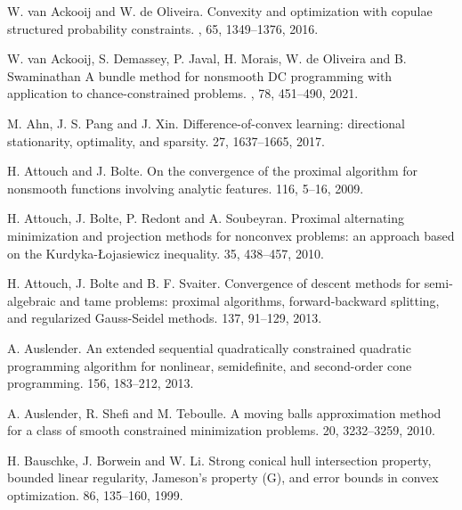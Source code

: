 \documentclass[10pt]{article}
\numberwithin{equation}{section}
\begin{document}
\begin{thebibliography}{99}

{\color{black} W. van Ackooij and W. de Oliveira.
\newblock Convexity and optimization with copulae
structured probability constraints.
, 65, 1349--1376, 2016.}

{\color{black} W. van Ackooij, S. Demassey, P. Javal, H. Morais, W. de Oliveira and B. Swaminathan
\newblock A bundle method for nonsmooth DC programming with application to chance-constrained problems.
, 78, 451--490, 2021.}


M. Ahn, J. S. Pang and J. Xin.
\newblock Difference-of-convex learning: directional stationarity, optimality, and sparsity.
 27, 1637--1665, 2017.


H. Attouch and J. Bolte.
\newblock On the convergence of the proximal algorithm for nonsmooth functions involving analytic features.
 116, 5--16, 2009.

H. Attouch, J. Bolte, P. Redont and A. Soubeyran.
\newblock Proximal alternating minimization and projection methods for nonconvex problems: an approach based on the Kurdyka-{\L}ojasiewicz inequality.
 35, 438--457, 2010.

H. Attouch, J. Bolte and B. F. Svaiter.
\newblock Convergence of descent methods for semi-algebraic and tame problems: proximal algorithms, forward-backward splitting, and regularized Gauss-Seidel methods.
 137, 91--129, 2013.

A. Auslender.
\newblock An extended sequential quadratically constrained quadratic programming algorithm for nonlinear, semidefinite, and second-order cone programming.
 156, 183--212, 2013.

A. Auslender, R. Shefi and M. Teboulle.
\newblock A moving balls approximation method for a class of smooth constrained minimization problems.
 20, 3232--3259, 2010.

H. Bauschke, J. Borwein and W. Li.
\newblock Strong conical hull intersection property, bounded linear regularity, Jameson's property (G), and error bounds in convex optimization.
 86, 135--160, 1999.


\end{thebibliography}
\end{document}
